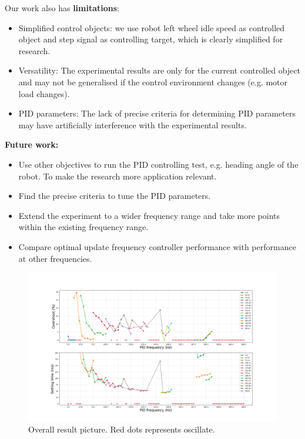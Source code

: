 \documentclass[conference]{IEEEtran}
\begin{document}
Our work also has \textbf{limitations}:
\begin{itemize}
    \item Simplified control objects: we use robot left wheel idle speed as controlled object and step signal as controlling target, which is clearly simplified for research.
    \item Versatility: The experimental results are only for the current controlled object and may not be generalised if the control environment changes (e.g. motor load changes).
    \item PID parameters: The lack of precise criteria for determining PID parameters may have artificially interference with the experimental results.
\end{itemize}

\textbf{Future work:}
\begin{itemize}
    \item Use other objectives to run the PID controlling test, e.g. heading angle of the robot. To make the research more application relevant.
    \item Find the precise criteria to tune the PID parameters.
    \item Extend the experiment to a wider frequency range and take more points within the existing frequency range.
    \item Compare optimal update frequency controller performance with performance at other frequencies.
\end{itemize}



 


\newpage
\onecolumn
\appendix
\begin{figure}[htbp]
\centerline{\includegraphics[width=1.3\linewidth]{Report/Pic/Appendix.png}}
\caption{Overall result picture. Red dots represents oscillate.}%
\label{fig_appendix}
\end{figure}
\end{document}

